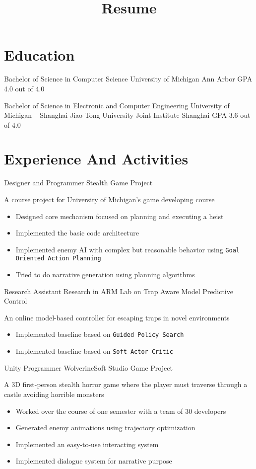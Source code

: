 \documentclass[10pt, a4paper, sans]{moderncv}
\title{Resume}
\begin{document}
\makecvtitle

\section{Education}
{Bachelor of Science in Computer Science}
{University of Michigan}
{Ann Arbor}
{GPA 4.0 out of 4.0}
{}

{Bachelor of Science in Electronic and Computer Engineering}
{University of Michigan -- Shanghai Jiao Tong University Joint Institute}
{Shanghai}
{GPA 3.6 out of 4.0}
{}

\section{Experience And Activities}
{Designer and Programmer}
{Stealth Game Project}
{}{}
{A course project for University of Michigan's game developing course
	\begin{itemize}
		\item Designed core mechanism focused on planning and executing a heist
		\item Implemented the basic code architecture
		\item Implemented enemy AI with complex but reasonable behavior using \texttt{Goal Oriented Action Planning}
		\item Tried to do narrative generation using planning algorithms
	\end{itemize}
}

{Research Assistant}
{Research in ARM Lab on Trap Aware Model Predictive Control}
{}{}
{An online model-based controller for escaping traps in novel environments
	\begin{itemize}
		\item Implemented baseline based on \texttt{Guided Policy Search}
		\item Implemented baseline based on \texttt{Soft Actor-Critic}
	\end{itemize}
}

{Unity Programmer}
{WolverineSoft Studio Game Project}
{}{}
{A 3D first-person stealth horror game where the player must traverse through a castle avoiding horrible monsters
	\begin{itemize}
		\item Worked over the course of one semester with a team of 30 developers
		\item Generated enemy animations using trajectory optimization
		\item Implemented an easy-to-use interacting system
		\item Implemented dialogue system for narrative purpose
	\end{itemize}
}
\end{document}
